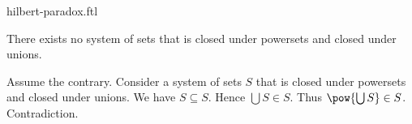 \documentclass{stex}
\begin{document}
\begin{smodule}{hilbert-paradox.ftl}

  \begin{ftheorem*}[label=hilbert_paradox,title=Hilbert's Paradox]
    There exists no system of sets that is closed under powersets and closed under unions.
  \end{ftheorem*}
  \begin{fproof}[method=contradiction]
    Assume the contrary.
    Consider a system of sets $S$ that is closed under powersets and closed under unions.
    We have $S \subseteq S$.
    Hence $\bigcup S \in S$.
    Thus $\pow{\bigcup S} \in S$.
    Contradiction.
  \end{fproof}
\end{smodule}
\end{document}
